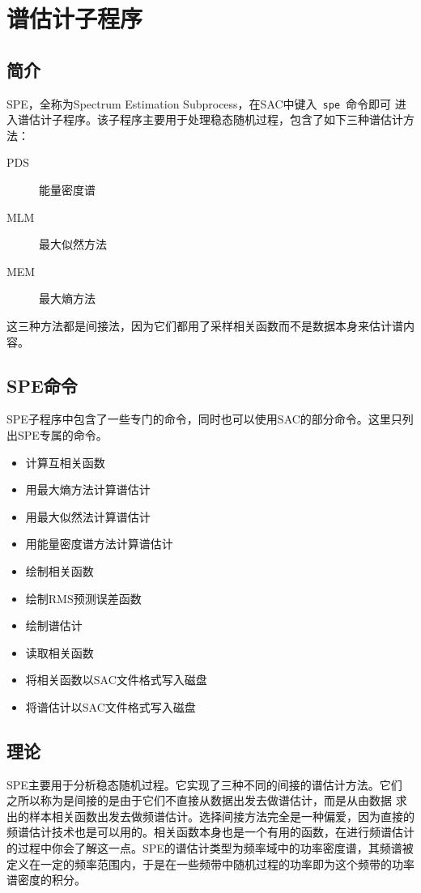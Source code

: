 \section{谱估计子程序}

\subsection{简介}
SPE，全称为Spectrum Estimation Subprocess，在SAC中键入~\lstinline{spe}~命令即可
进入谱估计子程序。该子程序主要用于处理稳态随机过程，包含了如下三种谱估计方法：

\begin{description}
\item [PDS] 能量密度谱
\item [MLM] 最大似然方法
\item [MEM] 最大熵方法
\end{description}

这三种方法都是间接法，因为它们都用了采样相关函数而不是数据本身来估计谱内容。

\subsection{SPE命令}
SPE子程序中包含了一些专门的命令，同时也可以使用SAC的部分命令。这里只列出SPE专属的命令。
\begin{itemize}
\item {} 计算互相关函数
\item {} 用最大熵方法计算谱估计
\item {} 用最大似然法计算谱估计
\item {} 用能量密度谱方法计算谱估计
\item {} 绘制相关函数
\item {} 绘制RMS预测误差函数
\item {} 绘制谱估计
\item {} 读取相关函数
\item {} 将相关函数以SAC文件格式写入磁盘
\item {} 将谱估计以SAC文件格式写入磁盘
\end{itemize}

\subsection{理论}
SPE主要用于分析稳态随机过程。它实现了三种不同的间接的谱估计方法。它们
之所以称为是间接的是由于它们不直接从数据出发去做谱估计，而是从由数据
求出的样本相关函数出发去做频谱估计。选择间接方法完全是一种偏爱，因为直接的
频谱估计技术也是可以用的。相关函数本身也是一个有用的函数，在进行频谱估计
的过程中你会了解这一点。SPE的谱估计类型为频率域中的功率密度谱，其频谱被
定义在一定的频率范围内，于是在一些频带中随机过程的功率即为这个频带的功率
谱密度的积分。

